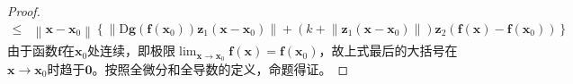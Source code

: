 \documentclass[../main.tex]{subfiles}
\begin{document}
\begin{proof}
\begin{align*}
        \leq & \left\|\mathbf{x}-\mathbf{x}_0\right\|\left\{\left\|\mathrm{D}\mathbf{g}\left(\mathbf{f}\left(\mathbf{x}_0\right)\right)\mathbf{z}_1\left(\mathbf{x}-\mathbf{x}_0\right)\right\|+\left(k+\left\|\mathbf{z}_1\left(\mathbf{x}-\mathbf{x}_0\right)\right\|\right)\mathbf{z}_2\left(\mathbf{f}\left(\mathbf{x}\right)-\mathbf{f}\left(\mathbf{x}_0\right)\right)\right\}
    \end{align*}
    由于函数$\mathbf{f}$在$\mathbf{x}_0$处连续，即极限$\lim_{\mathbf{x}\to\mathbf{x}_0}\mathbf{f}\left(\mathbf{x}\right)=\mathbf{f}\left(\mathbf{x}_0\right)$，故上式最后的大括号在$\mathbf{x}\to\mathbf{x}_0$时趋于$\mathbf{0}$。按照全微分和全导数的定义，命题得证。
\end{proof}
\end{document}
